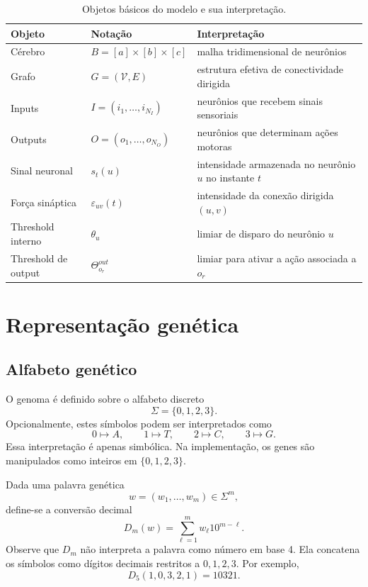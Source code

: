 \documentclass[12pt,a4paper,fleqn]{article}
\newcommand{\SigmaGen}{\Sigma}
\begin{document}
\begin{table}[H]
\centering
\caption{Objetos básicos do modelo e sua interpretação.}
\label{tab:objetos}
\begin{tabular}{p{2.6cm}p{4.2cm}p{7.2cm}}
\toprule
Objeto & Notação & Interpretação \\
\midrule
Cérebro & $B=[a]\times[b]\times[c]$ & malha tridimensional de neurônios \\
Grafo & $G=(\mathcal{V},E)$ & estrutura efetiva de conectividade dirigida \\
Inputs & $I=(i_1,\ldots,i_{N_I})$ & neurônios que recebem sinais sensoriais \\
Outputs & $O=(o_1,\ldots,o_{N_O})$ & neurônios que determinam ações motoras \\
Sinal neuronal & $s_t(u)$ & intensidade armazenada no neurônio $u$ no instante $t$ \\
Força sináptica & $\varepsilon_{uv}(t)$ & intensidade da conexão dirigida $(u,v)$ \\
Threshold interno & $\theta_u$ & limiar de disparo do neurônio $u$ \\
Threshold de output & $\Theta^{out}_{o_r}$ & limiar para ativar a ação associada a $o_r$ \\
\bottomrule
\end{tabular}
\end{table}

\section{Representação genética}

\subsection{Alfabeto genético}

O genoma é definido sobre o alfabeto discreto
$$
	\SigmaGen=\{0,1,2,3\}.
$$
Opcionalmente, estes símbolos podem ser interpretados como
$$
	0\mapsto A,\qquad 1\mapsto T,\qquad 2\mapsto C,\qquad 3\mapsto G.
$$
Essa interpretação é apenas simbólica. Na implementação, os genes são manipulados como inteiros em $\{0,1,2,3\}$.

Dada uma palavra genética
$$
	w=(w_1,\ldots,w_m)\in\SigmaGen^m,
$$
define-se a conversão decimal
$$
	D_m(w)=\sum_{\ell=1}^{m} w_\ell 10^{m-\ell}.
$$
Observe que $D_m$ não interpreta a palavra como número em base 4. Ela concatena os símbolos como dígitos decimais restritos a $0,1,2,3$. Por exemplo,
$$
	D_5(1,0,3,2,1)=10321.
$$
\end{document}
